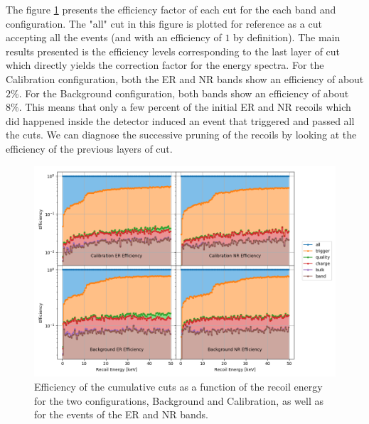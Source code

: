 The figure \ref{fig:cut-efficiency} presents the efficiency factor of each cut for the each band and configuration. The "all" cut in this figure is plotted for reference as a cut accepting all the events (and with an efficiency of $1$ by definition). The main results presented is the efficiency levels corresponding to the last layer of cut which directly yields the correction factor for the energy spectra. For the Calibration configuration, both the ER and NR bands show an efficiency of about $2\%$. For the Background configuration, both bands show an efficiency of about $8\%$. This means that only a few percent of the initial ER and NR recoils which did happened inside the detector induced an event that triggered and passed all the cuts. We can diagnose the successive pruning of the recoils by looking at the efficiency of the previous layers of cut.

\begin{figure}
\centering
\includegraphics[width=\linewidth,]{Figures/Neutron/cut_efficiency.png}
\caption{Efficiency of the cumulative cuts as a function of the recoil energy for the two configurations, Background and Calibration, as well as for the events of the ER and NR bands.}
\label{fig:cut-efficiency}
\end{figure}

